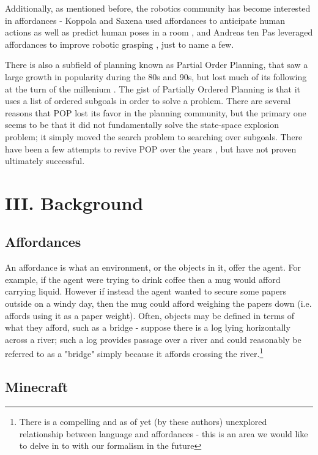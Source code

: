 \documentclass[a4paper]{article}
\begin{document}
Additionally, as mentioned before, the robotics community has become interested in affordances - Koppola and Saxena used affordances to anticipate human actions as well as predict human poses in a room \cite{Koppula2013a} \cite{Koppula2013b}, and Andreas ten Pas \cite{Pas} leveraged affordances to improve robotic grasping ,  just to name a few.

There is also a subfield of planning known as Partial Order Planning, that saw a large growth in popularity during the 80s and 90s, but lost much of its following at the turn of the millenium \cite{Norvig}. The gist of Partially Ordered Planning is that it uses a list of ordered subgoals in order to solve a problem. There are several reasons that POP lost its favor in the planning community, but the primary one seems to be that it did not fundamentally solve the state-space explosion problem; it simply moved the search problem to searching over subgoals. There have been a few attempts to revive POP over the years \cite{Nguyen2002}, but have not proven ultimately successful.

\section{III. Background}

\subsection*{Affordances}

An affordance is what an environment, or the objects in it, offer the agent. For example, if the agent were trying to drink coffee then a mug would afford carrying liquid. However if instead the agent wanted to secure some papers outside on a windy day, then the mug could afford weighing the papers down (i.e. affords using it as a paper weight). Often, objects may be defined in terms of what they afford, such as a bridge - suppose there is a log lying horizontally across a river; such a log provides passage over a river and could reasonably be referred to as a "bridge" simply because it affords crossing the river.\footnote{There is a compelling and as of yet (by these authors) unexplored relationship between language and affordances - this is an area we would like to delve in to with our formalism in the future}

\subsection{Minecraft}
\end{document}
